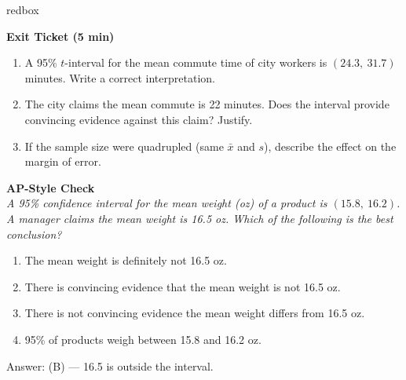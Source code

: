 \documentclass[10pt]{article}
\begin{document}
\begin{skillbox}{redbox}
\begin{minipage}[t]{0.48\linewidth}
    \textbf{Exit Ticket (5 min)}
    \begin{enumerate}
        \item A 95\% $t$-interval for the mean commute time of city workers is
              $(24.3,\ 31.7)$ minutes. Write a correct interpretation.
        \item The city claims the mean commute is 22 minutes. Does the interval
              provide convincing evidence against this claim? Justify.
        \item If the sample size were quadrupled (same $\bar x$ and $s$), describe
              the effect on the margin of error.
    \end{enumerate}
\end{minipage}
\hfill
\begin{minipage}[t]{0.48\linewidth}
    \textbf{AP-Style Check}\\
    \textit{A 95\% confidence interval for the mean weight (oz) of a product is
    $(15.8,\ 16.2)$. A manager claims the mean weight is 16.5 oz. Which of the
    following is the best conclusion?}
    \begin{enumerate}[label=(\Alph*)]
        \item The mean weight is definitely not 16.5 oz.
        \item There is convincing evidence that the mean weight is not 16.5 oz.
        \item There is not convincing evidence the mean weight differs from 16.5 oz.
        \item 95\% of products weigh between 15.8 and 16.2 oz.
    \end{enumerate}
    Answer: (B) --- 16.5 is outside the interval.
\end{minipage}
\end{skillbox}
\end{document}
